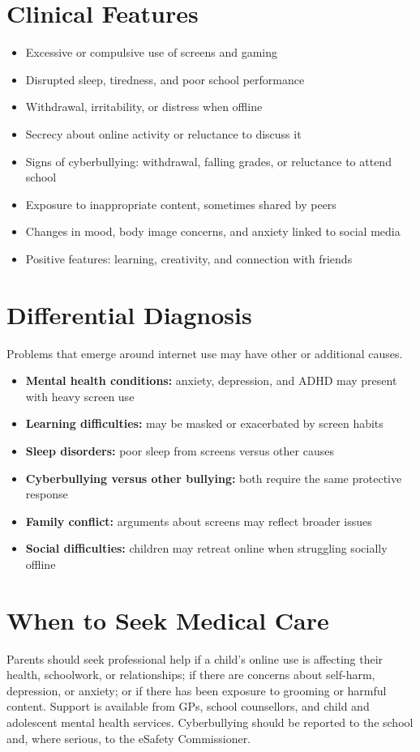 \section*{Clinical Features}
\begin{itemize}
    \item Excessive or compulsive use of screens and gaming
    \item Disrupted sleep, tiredness, and poor school performance
    \item Withdrawal, irritability, or distress when offline
    \item Secrecy about online activity or reluctance to discuss it
    \item Signs of cyberbullying: withdrawal, falling grades, or reluctance to attend school
    \item Exposure to inappropriate content, sometimes shared by peers
    \item Changes in mood, body image concerns, and anxiety linked to social media
    \item Positive features: learning, creativity, and connection with friends
\end{itemize}

\section*{Differential Diagnosis}
Problems that emerge around internet use may have other or additional causes.
\begin{itemize}
    \item \textbf{Mental health conditions:} anxiety, depression, and ADHD may present with heavy screen use
    \item \textbf{Learning difficulties:} may be masked or exacerbated by screen habits
    \item \textbf{Sleep disorders:} poor sleep from screens versus other causes
    \item \textbf{Cyberbullying versus other bullying:} both require the same protective response
    \item \textbf{Family conflict:} arguments about screens may reflect broader issues
    \item \textbf{Social difficulties:} children may retreat online when struggling socially offline
\end{itemize}

\section*{When to Seek Medical Care}
Parents should seek professional help if a child's online use is affecting their health, schoolwork, or relationships; if there are concerns about self-harm, depression, or anxiety; or if there has been exposure to grooming or harmful content. Support is available from GPs, school counsellors, and child and adolescent mental health services. Cyberbullying should be reported to the school and, where serious, to the eSafety Commissioner.

